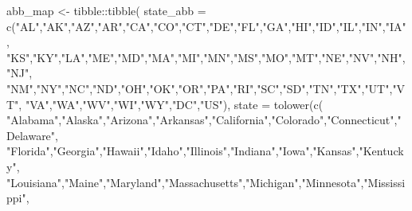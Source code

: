 \documentclass[
  english,
  letterpaper,
  DIV=11,
  numbers=noendperiod]{scrartcl}
\newenvironment{Shaded}{\begin{snugshade}}{\end{snugshade}}
\newcommand{\AttributeTok}[1]{\textcolor[rgb]{0.40,0.45,0.13}{#1}}
\newcommand{\FunctionTok}[1]{\textcolor[rgb]{0.28,0.35,0.67}{#1}}
\newcommand{\NormalTok}[1]{\textcolor[rgb]{0.00,0.23,0.31}{#1}}
\newcommand{\OtherTok}[1]{\textcolor[rgb]{0.00,0.23,0.31}{#1}}
\newcommand{\SpecialCharTok}[1]{\textcolor[rgb]{0.37,0.37,0.37}{#1}}
\newcommand{\StringTok}[1]{\textcolor[rgb]{0.13,0.47,0.30}{#1}}
\begin{document}
\begin{Shaded}
\begin{Highlighting}[]
\NormalTok{  abb\_map }\OtherTok{\textless{}{-}}\NormalTok{ tibble}\SpecialCharTok{::}\FunctionTok{tibble}\NormalTok{(}
    \AttributeTok{state\_abb =} \FunctionTok{c}\NormalTok{(}\StringTok{"AL"}\NormalTok{,}\StringTok{"AK"}\NormalTok{,}\StringTok{"AZ"}\NormalTok{,}\StringTok{"AR"}\NormalTok{,}\StringTok{"CA"}\NormalTok{,}\StringTok{"CO"}\NormalTok{,}\StringTok{"CT"}\NormalTok{,}\StringTok{"DE"}\NormalTok{,}\StringTok{"FL"}\NormalTok{,}\StringTok{"GA"}\NormalTok{,}\StringTok{"HI"}\NormalTok{,}\StringTok{"ID"}\NormalTok{,}\StringTok{"IL"}\NormalTok{,}\StringTok{"IN"}\NormalTok{,}\StringTok{"IA"}\NormalTok{,}
                  \StringTok{"KS"}\NormalTok{,}\StringTok{"KY"}\NormalTok{,}\StringTok{"LA"}\NormalTok{,}\StringTok{"ME"}\NormalTok{,}\StringTok{"MD"}\NormalTok{,}\StringTok{"MA"}\NormalTok{,}\StringTok{"MI"}\NormalTok{,}\StringTok{"MN"}\NormalTok{,}\StringTok{"MS"}\NormalTok{,}\StringTok{"MO"}\NormalTok{,}\StringTok{"MT"}\NormalTok{,}\StringTok{"NE"}\NormalTok{,}\StringTok{"NV"}\NormalTok{,}\StringTok{"NH"}\NormalTok{,}\StringTok{"NJ"}\NormalTok{,}
                  \StringTok{"NM"}\NormalTok{,}\StringTok{"NY"}\NormalTok{,}\StringTok{"NC"}\NormalTok{,}\StringTok{"ND"}\NormalTok{,}\StringTok{"OH"}\NormalTok{,}\StringTok{"OK"}\NormalTok{,}\StringTok{"OR"}\NormalTok{,}\StringTok{"PA"}\NormalTok{,}\StringTok{"RI"}\NormalTok{,}\StringTok{"SC"}\NormalTok{,}\StringTok{"SD"}\NormalTok{,}\StringTok{"TN"}\NormalTok{,}\StringTok{"TX"}\NormalTok{,}\StringTok{"UT"}\NormalTok{,}\StringTok{"VT"}\NormalTok{,}
                  \StringTok{"VA"}\NormalTok{,}\StringTok{"WA"}\NormalTok{,}\StringTok{"WV"}\NormalTok{,}\StringTok{"WI"}\NormalTok{,}\StringTok{"WY"}\NormalTok{,}\StringTok{"DC"}\NormalTok{,}\StringTok{"US"}\NormalTok{),}
    \AttributeTok{state =} \FunctionTok{tolower}\NormalTok{(}\FunctionTok{c}\NormalTok{(}
      \StringTok{"Alabama"}\NormalTok{,}\StringTok{"Alaska"}\NormalTok{,}\StringTok{"Arizona"}\NormalTok{,}\StringTok{"Arkansas"}\NormalTok{,}\StringTok{"California"}\NormalTok{,}\StringTok{"Colorado"}\NormalTok{,}\StringTok{"Connecticut"}\NormalTok{,}\StringTok{"Delaware"}\NormalTok{,}
      \StringTok{"Florida"}\NormalTok{,}\StringTok{"Georgia"}\NormalTok{,}\StringTok{"Hawaii"}\NormalTok{,}\StringTok{"Idaho"}\NormalTok{,}\StringTok{"Illinois"}\NormalTok{,}\StringTok{"Indiana"}\NormalTok{,}\StringTok{"Iowa"}\NormalTok{,}\StringTok{"Kansas"}\NormalTok{,}\StringTok{"Kentucky"}\NormalTok{,}
      \StringTok{"Louisiana"}\NormalTok{,}\StringTok{"Maine"}\NormalTok{,}\StringTok{"Maryland"}\NormalTok{,}\StringTok{"Massachusetts"}\NormalTok{,}\StringTok{"Michigan"}\NormalTok{,}\StringTok{"Minnesota"}\NormalTok{,}\StringTok{"Mississippi"}\NormalTok{,}

\end{Highlighting}
\end{Shaded}
\end{document}
